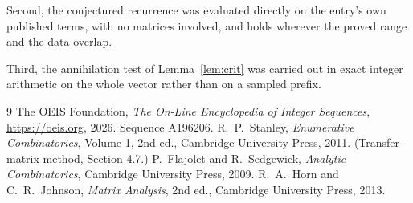 \documentclass[11pt,a4paper]{article}
\theoremstyle{plain}
\theoremstyle{definition}
\begin{document}
Second, the conjectured recurrence was evaluated directly on the entry's own published terms,
with no matrices involved, and holds wherever the proved range and the data overlap.

Third, the annihilation test of Lemma~\ref{lem:crit} was carried out in exact integer
arithmetic on the whole vector rather than on a sampled prefix.

\begin{thebibliography}{9}
 The OEIS Foundation, \emph{The On-Line Encyclopedia of Integer
Sequences}, \url{https://oeis.org}, 2026. Sequence A196206.
 R.~P.~Stanley, \emph{Enumerative Combinatorics}, Volume 1, 2nd ed.,
Cambridge University Press, 2011. (Transfer-matrix method, Section 4.7.)
 P.~Flajolet and R.~Sedgewick, \emph{Analytic Combinatorics}, Cambridge
University Press, 2009.
 R.~A.~Horn and C.~R.~Johnson, \emph{Matrix Analysis}, 2nd ed., Cambridge
University Press, 2013.
\end{thebibliography}
\end{document}
